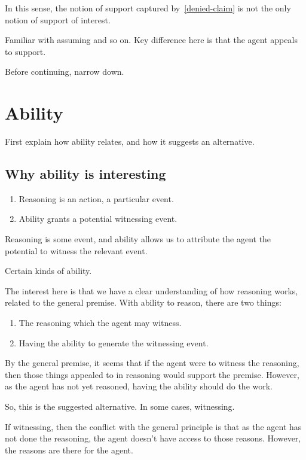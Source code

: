 In this sense, the notion of support captured by~\ref{denied-claim} is not the only notion of support of interest.

Familiar with assuming and so on.
Key difference here is that the agent appeals to support.

Before continuing, narrow down.



\section{Ability}
\label{sec:ability}

First explain how ability relates, and how it suggests an alternative.

\subsection{Why ability is interesting}
\label{sec:why-abil-inter}

\begin{enumerate}
\item Reasoning is an action, a particular event.
\item Ability grants a potential witnessing event.
\end{enumerate}

Reasoning is some event, and ability allows us to attribute the agent the potential to witness the relevant event.

Certain kinds of ability.

The interest here is that we have a clear understanding of how reasoning works, related to the general premise.
With ability to reason, there are two things:
\begin{enumerate}
\item The reasoning which the agent may witness.
\item Having the ability to generate the witnessing event.
\end{enumerate}

By the general premise, it seems that if the agent were to witness the reasoning, then those things appealed to in reasoning would support the premise.
However, as the agent has not yet reasoned, having the ability should do the work.

So, this is the suggested alternative.
In some cases, witnessing.

If witnessing, then the conflict with the general principle is that as the agent has not done the reasoning, the agent doesn't have access to those reasons.
However, the reasons are there for the agent.

